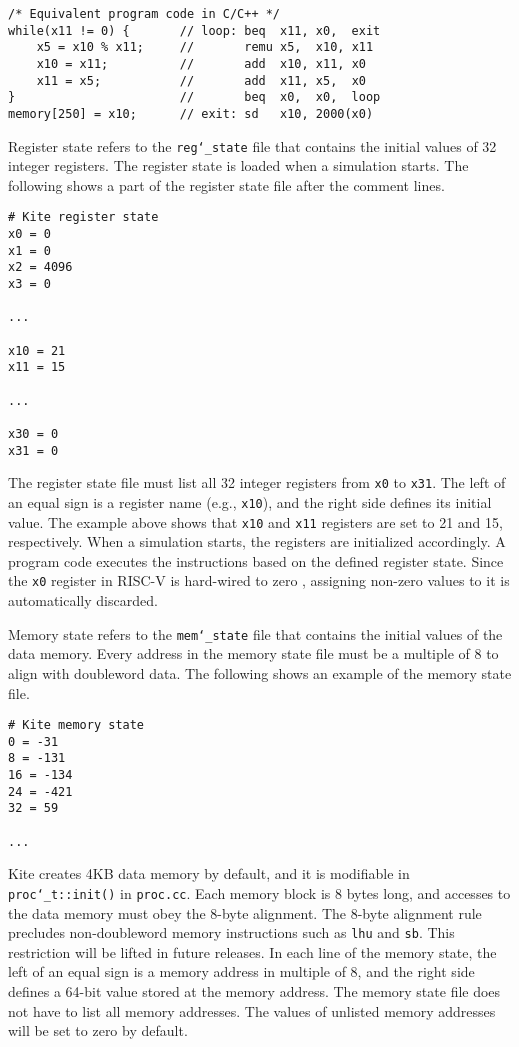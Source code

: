 \documentclass[10pt]{article}
\begin{document}
\begin{Verbatim}[frame=single,fontsize=\small]
/* Equivalent program code in C/C++ */
while(x11 != 0) {       // loop: beq  x11, x0,  exit
    x5 = x10 % x11;     //       remu x5,  x10, x11
    x10 = x11;          //       add  x10, x11, x0
    x11 = x5;           //       add  x11, x5,  x0
}                       //       beq  x0,  x0,  loop
memory[250] = x10;      // exit: sd   x10, 2000(x0)
\end{Verbatim}

Register state refers to the {\tt\small reg\char`_state} file that contains the initial values of 32 integer registers.
The register state is loaded when a simulation starts.
The following shows a part of the register state file after the comment lines.

\begin{Verbatim}[frame=single,fontsize=\small]
# Kite register state
x0 = 0
x1 = 0
x2 = 4096
x3 = 0

...

x10 = 21
x11 = 15

...

x30 = 0
x31 = 0
\end{Verbatim}

The register state file must list all 32 integer registers from {\tt\small x0} to {\tt\small x31}.
The left of an equal sign is a register name (e.g., {\tt\small x10}), and the right side defines its initial value.
The example above shows that {\tt\small x10} and {\tt\small x11} registers are set to 21 and 15, respectively.
When a simulation starts, the registers are initialized accordingly.
A program code executes the instructions based on the defined register state.
Since the {\tt\small x0} register in RISC-V is hard-wired to zero \cite{patterson_morgan2017}, assigning non-zero values to it is automatically discarded.

Memory state refers to the {\tt\small mem\char`_state} file that contains the initial values of the data memory.
Every address in the memory state file must be a multiple of 8 to align with doubleword data.
The following shows an example of the memory state file.

\begin{Verbatim}[frame=single,fontsize=\small]
# Kite memory state
0 = -31
8 = -131
16 = -134
24 = -421
32 = 59

...

\end{Verbatim}

Kite creates 4KB data memory by default, and it is modifiable in {\tt\small proc\char`_t::init()} in {\tt\small proc.cc}.
Each memory block is 8 bytes long, and accesses to the data memory must obey the 8-byte alignment.
The 8-byte alignment rule precludes non-doubleword memory instructions such as {\tt\small lhu} and {\tt\small sb}.
This restriction will be lifted in future releases.
In each line of the memory state, the left of an equal sign is a memory address in multiple of 8, and the right side defines a 64-bit value stored at the memory address.
The memory state file does not have to list all memory addresses.
The values of unlisted memory addresses will be set to zero by default.
\end{document}
